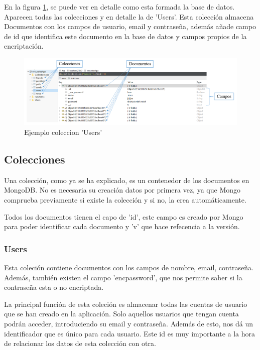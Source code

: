 \documentclass[a4paper, 12pt]{book}
\begin{document}
En la figura \ref{f:ej_col}, se puede ver en detalle como esta formada la base de datos. Aparecen todas las colecciones y en detalle la de 'Users'. Esta colecci\'on almacena Documentos con los campos de usuario, email y contrase\~na, adem\'as a\~nade campo de id que identifica este documento en la base de datos y campos propios de la encriptaci\'on. 

\begin{figure}[H]
  \centering
  \includegraphics[width=17cm, keepaspectratio]{img/ej_col.png}
  \caption{Ejemplo coleccion 'Users'}
  \label{f:ej_col}
\end{figure}


\subsection{Colecciones} 
\label{sec:colecciones}

Una colecci\'on, como ya se ha explicado, es un contenedor de los documentos en MongoDB. No es necesaria su creaci\'on datos por primera vez, ya que Mongo comprueba previamente si existe la colecci\'on y si no, la crea autom\'aticamente.

Todos los documentos tienen el capo de 'id', este campo es creado por Mongo para poder identificar cada documento y 'v' que hace refecencia a la versi\'on.

\subsubsection{Users} 
\label{sec:c_users}
Esta coleci\'on contiene documentos con los campos de nombre, email, contrase\~na. Adem\'as, tambi\'en existen el campo 'encpassword', que nos permite saber si la contrase\~na esta o no encriptada.

La principal funci\'on de esta coleci\'on es almacenar todas las cuentas de usuario que se han creado en la aplicaci\'on. Solo aquellos usuarios que tengan cuenta podr\'an acceder, introduciendo su email y contrase\~na. Adem\'as de esto, nos d\'a un identificador que es \'unico para cada usuario. Este id es muy importante a la hora de relacionar los datos de esta colecci\'on con otra.
\end{document}
